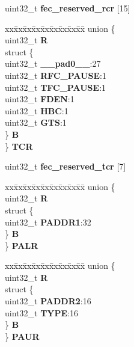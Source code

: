 \begin{DoxyCompactItemize}
\begin{tabbing}
\end{tabbing}\item 
\mbox{\label{structFEC__tag_a042fcc2e3c2fa0c04f96d7d9da4e64d4}} 
uint32\+\_\+t {\bfseries fec\+\_\+reserved\+\_\+rcr} \mbox{[}15\mbox{]}
\item 
\mbox{\label{structFEC__tag_ace21e7ca92320c693f5353a44ba7f766}} 
\begin{tabbing}
xx\=xx\=xx\=xx\=xx\=xx\=xx\=xx\=xx\=\kill
union \{\\
\>uint32\_t {\bfseries R}\\
\>struct \{\\
\>\>uint32\_t {\bfseries \_\_pad0\_\_}:27\\
\>\>uint32\_t {\bfseries RFC\_PAUSE}:1\\
\>\>uint32\_t {\bfseries TFC\_PAUSE}:1\\
\>\>uint32\_t {\bfseries FDEN}:1\\
\>\>uint32\_t {\bfseries HBC}:1\\
\>\>uint32\_t {\bfseries GTS}:1\\
\>\} {\bfseries B}\\
\} {\bfseries TCR}\\

\end{tabbing}\item 
\mbox{\label{structFEC__tag_a0c4512d7e6a9dd36010f48a161fd0068}} 
uint32\+\_\+t {\bfseries fec\+\_\+reserved\+\_\+tcr} \mbox{[}7\mbox{]}
\item 
\mbox{\label{structFEC__tag_a8a8d296e1bbbc0fb51938ceed6d73dff}} 
\begin{tabbing}
xx\=xx\=xx\=xx\=xx\=xx\=xx\=xx\=xx\=\kill
union \{\\
\>uint32\_t {\bfseries R}\\
\>struct \{\\
\>\>uint32\_t {\bfseries PADDR1}:32\\
\>\} {\bfseries B}\\
\} {\bfseries PALR}\\

\end{tabbing}\item 
\mbox{\label{structFEC__tag_a566e3459a56e8fce3f02e5aff936bb3d}} 
\begin{tabbing}
xx\=xx\=xx\=xx\=xx\=xx\=xx\=xx\=xx\=\kill
union \{\\
\>uint32\_t {\bfseries R}\\
\>struct \{\\
\>\>uint32\_t {\bfseries PADDR2}:16\\
\>\>uint32\_t {\bfseries TYPE}:16\\
\>\} {\bfseries B}\\
\} {\bfseries PAUR}\\


\end{tabbing}
\end{DoxyCompactItemize}
